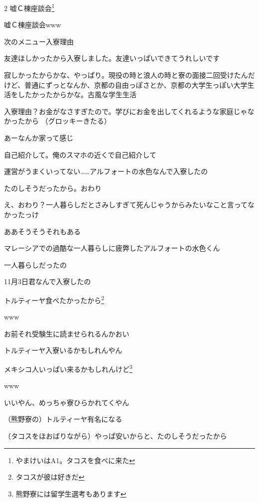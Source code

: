 \begin{multicols}{2}
 嘘Ｃ棟座談会\footnote{やまけいはA1。タコスを食べに来た}

 嘘Ｃ棟座談会www


 次のメニュー入寮理由

 友達ほしかったから入寮しました。友達いっぱいできてうれしいです

 寂しかったからかな、やっぱり。現役の時と浪人の時と寮の面接二回受けたんだけど、普通にずっとなんか、京都の自由っぽさとか、京都の大学生っぽい大学生活をしたかったからかな。古風な学生生活

 入寮理由？お金がなさすぎたので。学びにお金を出してくれるような家庭じゃなかったから
（グロッキーきたる）

 あーなんか家って感じ

 自己紹介して。俺のスマホの近くで自己紹介して

 運営がうまくいってない……アルフォートの水色なんで入寮したの

 たのしそうだったから。おわり

 え、おわり？一人暮らしだとさみしすぎて死んじゃうからみたいなこと言ってなかったっけ

 ああそうそうそれもある

 マレーシアでの過酷な一人暮らしに疲弊したアルフォートの水色くん

 一人暮らしだったの

 11月3日君なんで入寮したの

 トルティーヤ食べたかったから\footnote{タコスが彼は好きだ}

 www

 お前それ受験生に読ませられるんかおい

 トルティーヤ入寮いるかもしれんやん

 メキシコ人いっぱい来るかもしれんけど\footnote{熊野寮には留学生選考もあります}

 www

 いいやん、めっちゃ寮ひらかれてくやん

 （熊野寮の）トルティーヤ有名になる

 （タコスをほおばりながら）やっぱ安いからと、たのしそうだったから


\end{multicols}
